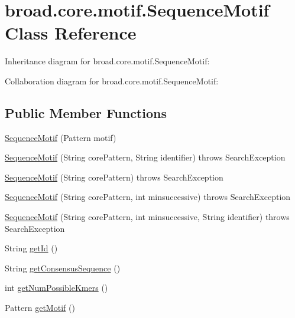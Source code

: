 \hypertarget{classbroad_1_1core_1_1motif_1_1_sequence_motif}{\section{broad.\+core.\+motif.\+Sequence\+Motif Class Reference}
\label{classbroad_1_1core_1_1motif_1_1_sequence_motif}
}


Inheritance diagram for broad.\+core.\+motif.\+Sequence\+Motif\+:


Collaboration diagram for broad.\+core.\+motif.\+Sequence\+Motif\+:
\subsection*{Public Member Functions}
\begin{DoxyCompactItemize}
\item 
\hyperlink{classbroad_1_1core_1_1motif_1_1_sequence_motif_a21d5829daae0736998246dd04054fe0f}{Sequence\+Motif} (Pattern motif)
\item 
\hyperlink{classbroad_1_1core_1_1motif_1_1_sequence_motif_aa172f05c111c4c2980608ce9650eb5cb}{Sequence\+Motif} (String core\+Pattern, String identifier)  throws Search\+Exception 
\item 
\hyperlink{classbroad_1_1core_1_1motif_1_1_sequence_motif_a93702581b7d827f94fc119dc4e7bfa07}{Sequence\+Motif} (String core\+Pattern)  throws Search\+Exception 
\item 
\hyperlink{classbroad_1_1core_1_1motif_1_1_sequence_motif_aaacb905ba38ee57797816f51cdc07e00}{Sequence\+Motif} (String core\+Pattern, int minsuccessive)  throws Search\+Exception 
\item 
\hyperlink{classbroad_1_1core_1_1motif_1_1_sequence_motif_a818070d65745d47d81940603ca75b8dd}{Sequence\+Motif} (String core\+Pattern, int minsuccessive, String identifier)  throws Search\+Exception 
\item 
String \hyperlink{classbroad_1_1core_1_1motif_1_1_sequence_motif_af0f6b0982fd6158c8fe56e344a6b4589}{get\+Id} ()
\item 
String \hyperlink{classbroad_1_1core_1_1motif_1_1_sequence_motif_a782ae826cd35a956402df350ef408c70}{get\+Consensus\+Sequence} ()
\item 
int \hyperlink{classbroad_1_1core_1_1motif_1_1_sequence_motif_a6f6e246a25237a0b46d9a5f1a6ec5df2}{get\+Num\+Possible\+Kmers} ()
\item 
Pattern \hyperlink{classbroad_1_1core_1_1motif_1_1_sequence_motif_ae325c3588311a2f9fdea517b81fdd670}{get\+Motif} ()

\end{DoxyCompactItemize}
